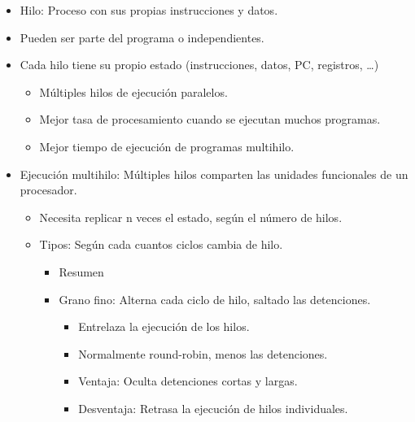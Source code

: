 \documentclass[12pt, twoside, openright]{report} %
\begin{document}
\begin{itemize}
	\item Hilo: Proceso con sus propias instrucciones y datos.
	\item Pueden ser parte del programa o independientes.
	\item Cada hilo tiene su propio estado (instrucciones, datos, PC,
	      registros, \ldots)

	      \begin{itemize}

		      \item Múltiples hilos de ejecución paralelos.
		      \item Mejor tasa de procesamiento cuando se ejecutan muchos
		            programas.
		      \item Mejor tiempo de ejecución de programas multihilo.
	      \end{itemize}
	\item Ejecución multihilo: Múltiples hilos comparten las unidades
	      funcionales de un procesador.

	      \begin{itemize}

		      \item Necesita replicar n veces el estado, según el número de hilos.

		      \item Tipos: Según cada cuantos ciclos cambia de hilo.
		            \begin{itemize}
			            \item Resumen
			                  \begin{figure}[H]
				                  {\def\svgwidth{.8\textwidth}
					                  }
			                  \end{figure}
			            \item Grano fino: Alterna cada ciclo de hilo, saltado las detenciones.
			                  \begin{itemize}
				                  \item Entrelaza la ejecución de los hilos.
				                  \item Normalmente round-robin, menos las detenciones.
				                  \item Ventaja: Oculta detenciones cortas y largas.
				                  \item Desventaja: Retrasa la ejecución de hilos individuales.
			                  \end{itemize}


\end{itemize}
\end{itemize}
\end{itemize}
\end{document}
